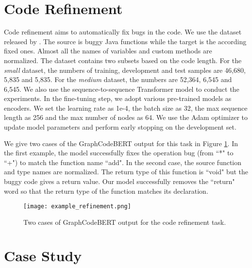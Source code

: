 \documentclass{article} \usepackage{iclr2021_conference,times}
\begin{document}
\section{Code Refinement} 
Code refinement aims to automatically fix bugs in the code. We use the dataset released by \citet{tufano2019empirical}. The source is buggy Java functions while the target is the according fixed ones. Almost all the names of variables and custom methods are normalized. The dataset contains two subsets based on the code length. For the \textit{small} dataset, the numbers of training, development and test samples are 46,680, 5,835 and 5,835. For the \textit{medium} dataset, the numbers are 52,364, 6,545 and 6,545. We also use the sequence-to-sequence Transformer model to conduct the experiments. In the fine-tuning step, we adopt various pre-trained models as encoders. We set the learning rate as 1e-4, the batch size as 32, the max sequence length as 256 and the max number of nodes as 64. We use the Adam optimizer to update model parameters and perform early stopping on the development set. 

We give two cases of the GraphCodeBERT output for this task in Figure \ref{example_refinement}. In the first example, the model successfully fixes the operation bug (from ``*" to ``+") to match the function name ``add". In the second case, the source function and type names are normalized. The return type of this function is ``void" but the buggy code gives a return value. Our model successfully removes the ``return" word so that the return type of the function matches its declaration. 

\begin{figure}[h]
\begin{center}
		\texttt{[image: example\_refinement.png]}
		\caption{Two cases of GraphCodeBERT output for the code refinement task.}
		\label{example_refinement}
	\end{center}
\end{figure}




\section{Case Study}
\end{document}
